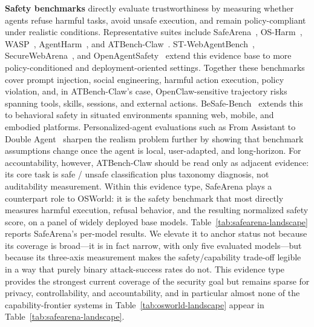 \textbf{Safety benchmarks} directly evaluate trustworthiness by measuring whether agents refuse harmful tasks, avoid unsafe execution, and remain policy-compliant under realistic conditions. Representative suites include SafeArena~\cite{safearena2025}, OS-Harm~\cite{osharm2025}, WASP~\cite{wasp2025}, AgentHarm~\cite{agentharm2024}, and ATBench-Claw~\cite{atbenchclaw2026}. ST-WebAgentBench~\cite{stwebagentbench2025}, SecureWebArena~\cite{securewebarena2025}, and OpenAgentSafety~\cite{openagentsafety2025} extend this evidence base to more policy-conditioned and deployment-oriented settings. Together these benchmarks cover prompt injection, social engineering, harmful action execution, policy violation, and, in ATBench-Claw's case, OpenClaw-sensitive trajectory risks spanning tools, skills, sessions, and external actions. BeSafe-Bench~\cite{besafebench2026} extends this to behavioral safety in situated environments spanning web, mobile, and embodied platforms. Personalized-agent evaluations such as From Assistant to Double Agent~\cite{doubleagent2026} sharpen the realism problem further by showing that benchmark assumptions change once the agent is local, user-adapted, and long-horizon. For accountability, however, ATBench-Claw should be read only as adjacent evidence: its core task is safe / unsafe classification plus taxonomy diagnosis, not auditability measurement. Within this evidence type, SafeArena plays a counterpart role to OSWorld: it is the safety benchmark that most directly measures harmful execution, refusal behavior, and the resulting normalized safety score, on a panel of widely deployed base models. Table~\ref{tab:safearena-landscape} reports SafeArena's per-model results. We elevate it to anchor status not because its coverage is broad---it is in fact narrow, with only five evaluated models---but because its three-axis measurement makes the safety/capability trade-off legible in a way that purely binary attack-success rates do not. This evidence type provides the strongest current coverage of the security goal but remains sparse for privacy, controllability, and accountability, and in particular almost none of the capability-frontier systems in Table~\ref{tab:osworld-landscape} appear in Table~\ref{tab:safearena-landscape}.


